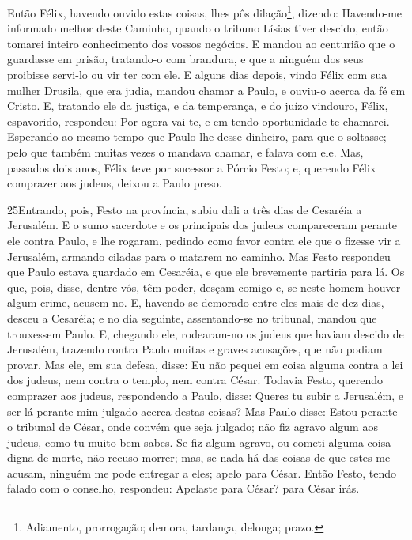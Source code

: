 Então Félix, havendo ouvido estas coisas, lhes pôs
dilação\footnote{Adiamento, prorrogação; demora, tardança, delonga;
prazo.}, dizendo: Havendo-me informado melhor deste Caminho, quando
o tribuno Lísias tiver descido, então tomarei inteiro conhecimento
dos vossos negócios. E mandou ao centurião que o guardasse em
prisão, tratando-o com brandura, e que a ninguém dos seus proibisse
servi-lo ou vir ter com ele. E alguns dias depois, vindo
Félix com sua mulher Drusila, que era judia, mandou chamar a Paulo,
e ouviu-o acerca da fé em Cristo. E, tratando ele da justiça,
e da temperança, e do juízo vindouro, Félix, espavorido, respondeu:
Por agora vai-te, e em tendo oportunidade te chamarei.
Esperando ao mesmo tempo que Paulo lhe desse dinheiro, para
que o soltasse; pelo que também muitas vezes o mandava chamar, e
falava com ele. Mas, passados dois anos, Félix teve por
sucessor a Pórcio Festo; e, querendo Félix comprazer aos judeus,
deixou a Paulo preso.

\medskip

\lettrine{25} Entrando, pois, Festo na província, subiu dali a
três dias de Cesaréia a Jerusalém. E o sumo sacerdote e os
principais dos judeus compareceram perante ele contra Paulo, e lhe
rogaram, pedindo como favor contra ele que o fizesse vir a
Jerusalém, armando ciladas para o matarem no caminho. Mas Festo
respondeu que Paulo estava guardado em Cesaréia, e que ele
brevemente partiria para lá. Os que, pois, disse, dentre vós,
têm poder, desçam comigo e, se neste homem houver algum crime,
acusem-no. E, havendo-se demorado entre eles mais de dez dias,
desceu a Cesaréia; e no dia seguinte, assentando-se no tribunal,
mandou que trouxessem Paulo. E, chegando ele, rodearam-no os
judeus que haviam descido de Jerusalém, trazendo contra Paulo muitas
e graves acusações, que não podiam provar. Mas ele, em sua
defesa, disse: Eu não pequei em coisa alguma contra a lei dos
judeus, nem contra o templo, nem contra César. Todavia Festo,
querendo comprazer aos judeus, respondendo a Paulo, disse: Queres tu
subir a Jerusalém, e ser lá perante mim julgado acerca destas
coisas? Mas Paulo disse: Estou perante o tribunal de César,
onde convém que seja julgado; não fiz agravo algum aos judeus, como
tu muito bem sabes. Se fiz algum agravo, ou cometi alguma
coisa digna de morte, não recuso morrer; mas, se nada há das coisas
de que estes me acusam, ninguém me pode entregar a eles; apelo para
César. Então Festo, tendo falado com o conselho, respondeu:
Apelaste para César? para César irás.

